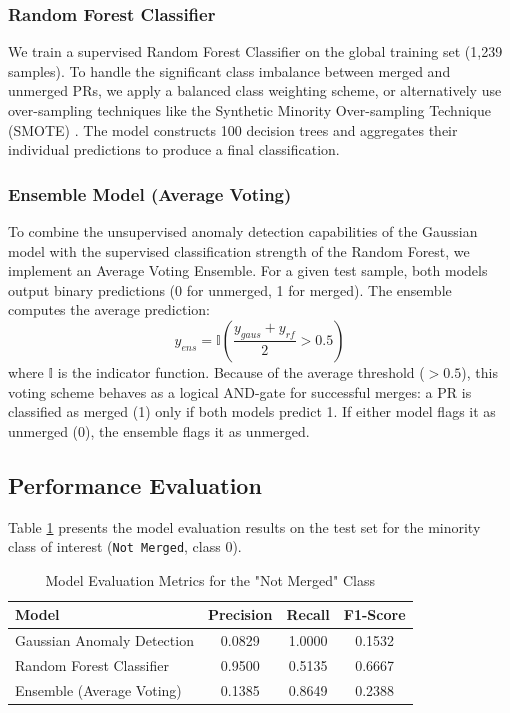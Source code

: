 \documentclass[conference]{IEEEtran}
\begin{document}
\subsubsection{Random Forest Classifier}
We train a supervised Random Forest Classifier on the global training set (1,239 samples). To handle the significant class imbalance between merged and unmerged PRs, we apply a balanced class weighting scheme, or alternatively use over-sampling techniques like the Synthetic Minority Over-sampling Technique (SMOTE) \cite{b7}. The model constructs 100 decision trees and aggregates their individual predictions to produce a final classification.

\subsubsection{Ensemble Model (Average Voting)}
To combine the unsupervised anomaly detection capabilities of the Gaussian model with the supervised classification strength of the Random Forest, we implement an Average Voting Ensemble. For a given test sample, both models output binary predictions (0 for unmerged, 1 for merged). The ensemble computes the average prediction:
\begin{equation}
y_{ens} = \mathbb{I}\left( \frac{y_{gaus} + y_{rf}}{2} > 0.5 \right)
\end{equation}
where $\mathbb{I}$ is the indicator function. Because of the average threshold ($>0.5$), this voting scheme behaves as a logical AND-gate for successful merges: a PR is classified as merged (1) only if both models predict 1. If either model flags it as unmerged (0), the ensemble flags it as unmerged.

\subsection{Performance Evaluation}
Table \ref{tab:model_metrics} presents the model evaluation results on the test set for the minority class of interest (\texttt{Not Merged}, class 0). 

\begin{table}[htbp]
\caption{Model Evaluation Metrics for the "Not Merged" Class}
\begin{center}
\begin{tabular}{lccc}
\toprule
\textbf{Model} & \textbf{Precision} & \textbf{Recall} & \textbf{F1-Score} \\
\midrule
Gaussian Anomaly Detection & 0.0829 & 1.0000 & 0.1532 \\
Random Forest Classifier & 0.9500 & 0.5135 & 0.6667 \\
Ensemble (Average Voting) & 0.1385 & 0.8649 & 0.2388 \\
\bottomrule
\end{tabular}
\label{tab:model_metrics}
\end{center}
\end{table}
\end{document}
